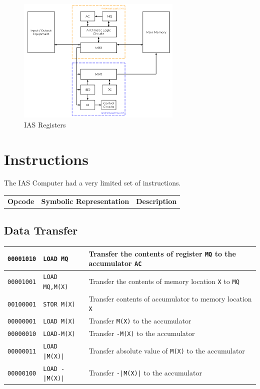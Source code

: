 \begin{figure}[H]
    \centering
    \includegraphics[width=0.7\textwidth]{assets/ias-registers.png}
    \caption{IAS Registers}
\end{figure}

\section{Instructions}
The IAS Computer had a very limited set of instructions.
\begin{table}[H]
    \centering
    \begin{tabularx}{\textwidth}{XXX}
        \textbf{Opcode} & \textbf{Symbolic Representation} & \textbf{Description}\\
    \end{tabularx}
\end{table}

\subsection{Data Transfer}
\begin{table}[H]
    \centering
    \begin{tabularx}{\textwidth}{XXX}
        \hline
        \texttt{00001010} & \texttt{LOAD MQ} & Transfer the contents of register \texttt{MQ} to the accumulator \texttt{AC}\\
        \hline
        \texttt{00001001} & \texttt{LOAD MQ,M(X)} & Transfer the contents of memory location \texttt{X} to \texttt{MQ}\\
        \hline
        \texttt{00100001} & \texttt{STOR M(X)} & Transfer contents of accumulator to memory location \texttt{X}\\
        \hline
        \texttt{00000001} & \texttt{LOAD M(X)} & Transfer \texttt{M(X)} to the accumulator\\
        \hline
        \texttt{00000010} & \texttt{LOAD-M(X)} & Transfer \texttt{-M(X)} to the accumulator\\
        \hline
        \texttt{00000011} & \texttt{LOAD |M(X)|} & Transfer absolute value of \texttt{M(X)} to the accumulator\\
        \hline
        \texttt{00000100} & \texttt{LOAD -|M(X)|} & Transfer \texttt{-|M(X)|} to the accumulator\\
        \hline
    \end{tabularx}
\end{table}

